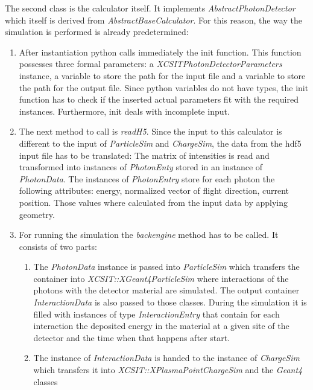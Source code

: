 The second class is the calculator itself. It implements
\textit{AbstractPhotonDetector} which itself is derived from
\textit{AbstractBaseCalculator}. For this reason, the way the simulation is
performed is already predetermined:
%
\begin{enumerate}
  \item After instantiation python calls immediately the init function. This
    function possesses three formal parameters: a
    \textit{XCSITPhotonDetectorParameters} instance, a variable to store the path
    for the input file and a variable to store the path for the output file. Since
    python variables do not have types, the init function has to check if the
    inserted actual parameters fit with the required instances. Furthermore, init
    deals with incomplete input.
  \item The next method to call is \textit{readH5}.
    Since the input to this calculator is different to the input of
    \textit{ParticleSim} and \textit{ChargeSim}, the data from the hdf5 input file
    has to be translated: The matrix of intensities is read and transformed into
    instances of \textit{PhotonEnty} stored in an instance of \textit{PhotonData}.
    The instances of \textit{PhotonEntry} store for each photon the following
    attributes: energy, normalized vector of flight direction, current position.
    Those values where calculated from the input data by applying geometry.
  \item For running the simulation the \textit{backengine} method has to be called. It consists of two parts:
    \begin{enumerate}
      \item The \textit{PhotonData} instance is passed into \textit{ParticleSim}
        which transfers the container into \textit{XCSIT::XGeant4ParticleSim}
        where interactions of the photons with the detector material are simulated.
        The output container \\ \textit{InteractionData} is also passed to those
        classes. During the simulation it is filled with instances of type
        \textit{InteractionEntry} that contain for each interaction the deposited energy
        in the material at a given site of the detector and the time when that happens
        after start.
      \item The instance of \textit{InteractionData} is handed to the
        instance of \textit{ChargeSim} which transfers it into
        \textit{XCSIT::XPlasmaPointChargeSim} and the \textit{Geant4} \\ classes

\end{enumerate}
\end{enumerate}
